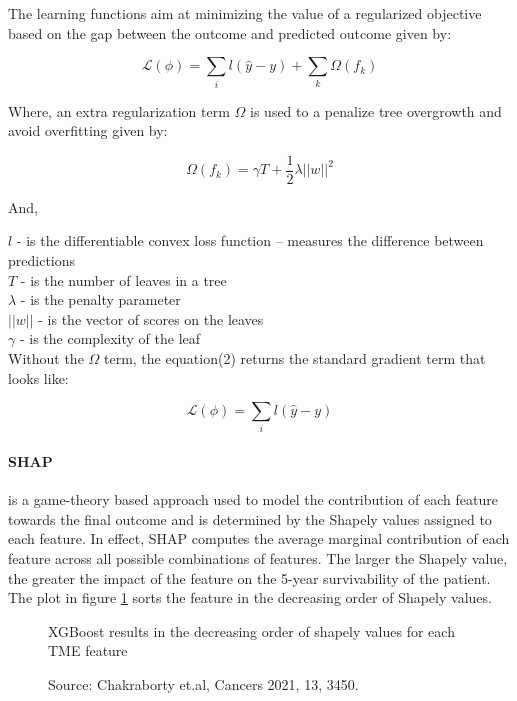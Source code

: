 \documentclass[sigconf, language=english]{acmart}
\begin{document}
The learning functions aim at minimizing the value of a regularized objective based on the gap between the outcome and predicted outcome given by:

\begin{equation}
\mathcal{L}(\phi) = \sum_{i} l(\hat{y} - y) + \sum_{k} \Omega(f_k)
\end{equation}

Where, an extra regularization term \(\Omega\) is used to a penalize tree overgrowth and avoid overfitting given by:

$$ \Omega(f_k) = \gamma T + \frac{1}{2} \lambda ||w||^2 $$

And,

\(l\) - is the differentiable convex loss function – measures the difference between predictions\\
\(T\) - is the number of leaves in a tree\\
\(\lambda\) - is the penalty parameter\\
\(||w||\) - is the vector of scores on the leaves\\
\(\gamma\) - is the complexity of the leaf\\

Without the \(\Omega\) term, the equation(2) returns the standard gradient term that looks like:

\begin{equation}
\mathcal{L}(\phi) = \sum_{i} l(\hat{y} - y)
\end{equation}


\paragraph{SHAP} is a game-theory based approach used to model the contribution of each feature towards the final outcome and is determined by the Shapely values assigned to each feature. In effect, SHAP computes the average marginal contribution of each feature across all possible combinations of features. The larger the Shapely value, the greater the impact of the feature on the 5-year survivability of the patient. The plot in figure \ref{xgboostres} sorts the feature in the decreasing order of Shapely values.

\begin{figure}
  \centering
    \caption{XGBoost results in the decreasing order of shapely values for each TME feature}
    \caption*{Source: Chakraborty et.al, Cancers 2021, 13, 3450.}
  \label{xgboostres}
\end{figure}
\end{document}
